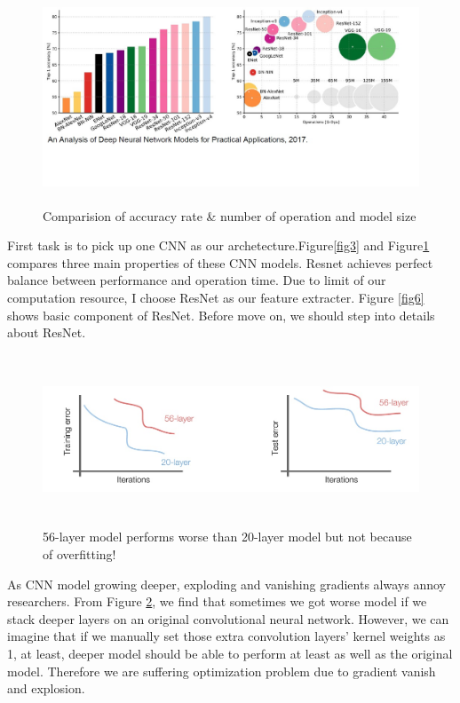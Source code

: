 \documentclass[12pt]{report}
\begin{document}
\begin{figure}
	\includegraphics[height = 2.5in, width = 5in]{4.jpg}
	\caption{Comparision of accuracy rate \& number of operation and model size}
	\label{fig4}
\end{figure}
\par First task is to pick up one CNN as our archetecture.Figure\ref{fig3} and Figure\ref{fig4} compares three main properties of these CNN models. Resnet achieves perfect balance between performance and operation time. Due to limit of our computation resource, I choose ResNet as our feature extracter. Figure \ref{fig6} shows basic component of ResNet. Before move on, we should step into details about ResNet.
\begin{figure}
	\includegraphics[height = 2in, width = 5in]{7.jpg}
	\caption{56-layer model performs worse than 20-layer model but not because of overfitting!}
	\label{fig7}
\end{figure}
\par As CNN model growing deeper, exploding \cite{exploding} and vanishing \cite{vanishing} gradients always annoy researchers. From Figure \ref{fig7}, we find that sometimes we got worse model if we stack deeper layers on an original convolutional neural network. However, we can imagine that if we manually set those extra convolution layers' kernel weights as 1, at least, deeper model should be able to perform at least as well as the original model. Therefore we are suffering optimization problem due to gradient vanish and explosion. 
\end{document}
